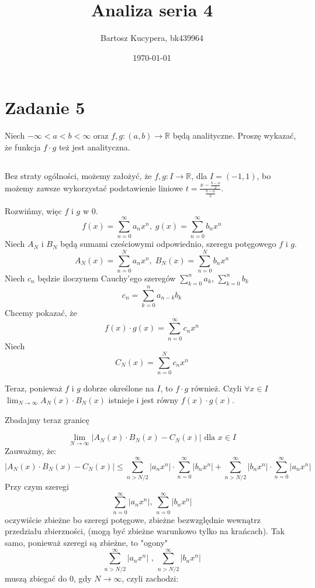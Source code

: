 \documentclass{article}
\title{Analiza seria 4}
\author{Bartosz Kucypera, bk439964}
\date{\today}
\begin{document}
\maketitle

\section*{Zadanie 5} 
Niech $-\infty < a < b < \infty$ oraz $f,g:(a,b) \to \mathbb{R}$ będą analityczne. Proszę wykazać, że funkcja $f \cdot g$ też jest analityczna.

\subsection*{}
Bez straty ogólności, możemy założyć, że $f,g:I \to \mathbb{R}$, dla $I= (-1,1)$, bo możemy zawsze wykorzystać podstawienie liniowe $\displaystyle t = \frac{x-\frac{b-a}{2}}{\frac{b-a}{2}}$. \newline

Rozwińmy, więc $f$ i $g$ w 0.
$$f(x) = \sum_{n=0}^{\infty}a_nx^n, \; g(x) = \sum_{n=0}^{\infty}b_nx^n$$
Niech $A_N$ i $B_N$ będą sumami cześciowymi odpowiednio, szeregu potęgowego $f$ i $g$.
$$A_N(x) = \sum_{n=0}^{N}a_nx^n, \; B_N(x) = \sum_{n=0}^{N}b_nx^n$$
Niech $c_n$ będzie iloczynem Cauchy'ego szeregów $\sum_{k=0}^{n}a_k$, $\sum_{k=0}^{n}b_k$
$$c_n = \sum_{k=0}^{n}a_{n-k}b_k$$
Chcemy pokazać, że 
$$f(x) \cdot g(x) = \sum_{n=0}^{\infty}c_nx^n$$
Niech
$$C_N(x) = \sum_{n=0}^{N}c_nx^n$$

Teraz, ponieważ $f$ i $g$ dobrze określone na $I$, to $f \cdot g$ również.
Czyli $\forall x \in I$ $\lim_{N \to \infty} A_N(x) \cdot B_N(x)$ istnieje i jest równy $f(x)\cdot g(x)$. \newline

\newpage

Zbadajmy teraz granicę

$$ \lim_{N \to \infty} |A_N(x) \cdot B_N(x) - C_N(x)| \mbox{ dla } x\in I$$
Zauważmy, że:
$$\left| A_N(x)\cdot B_N(x) - C_N(x) \right| \le 
\sum_{n>N/2}^{\infty}\left|a_nx^n\right|\cdot\sum_{n=0}^{\infty}|b_nx^n| + 
\sum_{n>N/2}^{\infty}\left|b_nx^n\right|\cdot\sum_{n=0}^{\infty}|a_nx^n|
$$
Przy czym szeregi
$$\sum_{n=0}^{\infty}|a_nx^n| \mbox{, } \sum_{n=0}^{\infty}|b_nx^n|$$
oczywiście zbieżne bo szeregi potęgowe, zbieżne bezwzględnie wewnątrz przedziału zbierzności, (mogą być zbieżne warunkowo tylko na krańcach). \newline
Tak samo, ponieważ szeregi są zbieżne, to "ogony" 
$$\sum_{n>N/2}^{\infty}|a_nx^n| \mbox{ , } \sum_{n>N/2}^{\infty}|b_nx^n|$$
muszą zbiegać do 0, gdy $N\to\infty$, czyli zachodzi:
\end{document}
